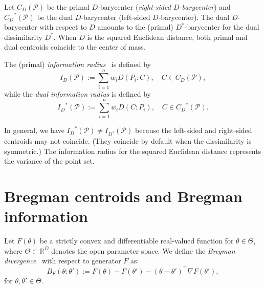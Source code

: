 \documentclass[11pt]{article}
\def\bbR{\mathbb{R}}
\def\calP{\mathcal{P}}
\begin{document}
Let $C_D(\calP)$ be the primal $D$-barycenter ({\em right-sided $D$-barycenter}) and ${C_D}^*(\calP)$  be the dual $D$-barycenter (left-sided $D$-barycenter).
The dual $D$-barycenter with respect to $D$ amounts to the (primal) $D^*$-barycenter for the dual dissimilarity $D^*$.
When $D$ is the squared Euclidean distance, both primal and dual centroids coincide to the center of mass.

The (primal) {\em information radius}~\cite{InformationRadius-1969} is defined by
\begin{equation}
I_D(\calP) :=  \sum_{i=1}^n w_i D(P_i:C),\quad C\in C_D(\calP),
\end{equation}
while the {\em dual information radius} is defined by
\begin{equation}
{I_D}^*(\calP) :=  \sum_{i=1}^n w_i D(C:P_i),\quad C\in {C_D}^*(\calP).
\end{equation}

In general, we have ${I_D}^*(\calP)\not ={I_{D^*}}(\calP)$ because the left-sided and right-sided centroids may not coincide.
(They coincide by default when the dissimilarity is symmetric.)
The information radius for the squared Euclidean distance represents the variance of the point set.

\section{Bregman centroids and Bregman information}

Let $F(\theta)$ be a strictly convex and differentiable real-valued function for $\theta\in\Theta$, where $\Theta\subset \bbR^D$ denotes the  open parameter space.
We define the {\em Bregman divergence}~\cite{Bregman-1967} with respect to generator $F$ as:
\begin{equation}
B_F(\theta:\theta'):=F(\theta)-F(\theta')-(\theta-\theta')^\top \nabla F(\theta'),
\end{equation}
for $\theta,\theta'\in \Theta$.
\end{document}
